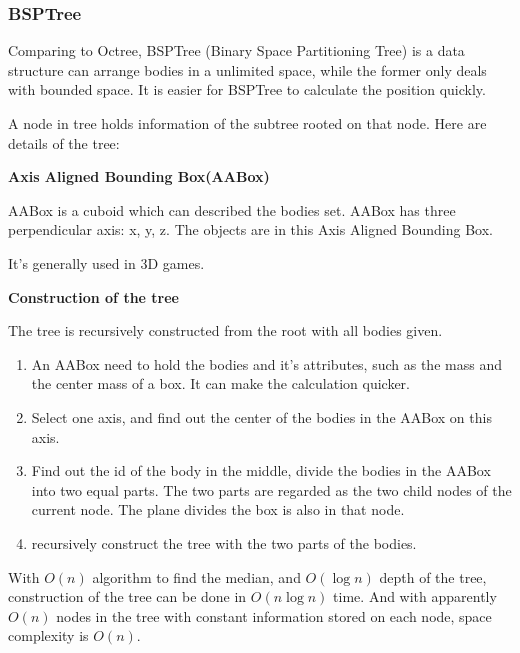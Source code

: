 \documentclass{article}
\begin{document}
			\subsubsection{BSPTree}

				Comparing to Octree, BSPTree (Binary Space Partitioning Tree)
				is a data structure can arrange bodies in a unlimited space,
				while the former only deals with bounded space. It is easier
				for BSPTree to calculate the position quickly.

				A node in tree holds information of the subtree rooted on that
				node.
				Here are details of the tree:
				\begin{description}
					\item {\bf Axis Aligned Bounding Box(AABox)}

						AABox is a cuboid which can described the bodies set.
						AABox has three perpendicular axis: x, y, z. The objects
						are in this Axis Aligned Bounding Box.

						It's generally used in 3D games.

					\item {\bf Construction of the tree}

						The tree is recursively constructed from the root with
						all bodies given.
						\begin{enumerate}
							\item
								An AABox need to hold the bodies and it's
								attributes, such as the mass and the center
								mass of a box. It can make the calculation
								quicker.
							\item
								Select one axis, and find out the center of
								the bodies in the AABox on this axis.
							\item
								Find out the id of the body in the middle,
								divide the bodies in the AABox into two equal
								parts. The two parts are regarded as the two
								child nodes of the current node. The plane
								divides the box is also in that node.

							\item recursively construct the tree with the two
								parts of the bodies.
						\end{enumerate}

						With $O(n)$ algorithm to find the median, and
						$O(\log{n})$ depth of the tree, construction of the
						tree can be done in $O(n \log{n})$ time. And with
						apparently $O(n)$ nodes in the tree with constant
						information stored on each node, space complexity is
						$O(n)$.


\end{description}
\end{document}
